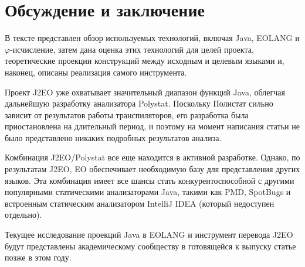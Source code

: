 \documentclass[oneside,final,14pt,a4paper]{extreport}
\theoremstyle{definition}
\theoremstyle{remark}
\theoremstyle{remark}
\begin{document}
\section{Обсуждение и заключение}

В тексте представлен обзор используемых технологий, включая Java, EOLANG и $\varphi$-исчисление, затем дана оценка этих технологий для целей проекта, теоретические проекции конструкций между исходным и целевым языками и, наконец, описаны реализация самого инструмента.

Проект J2EO уже охватывает значительный диапазон функций Java, облегчая дальнейшую разработку анализатора Polystat. Поскольку Полистат сильно зависит от результатов работы транспиляторов, его разработка была приостановлена ​​на длительный период, и поэтому на момент написания статьи не было представлено никаких подробных результатов анализа.

Комбинация J2EO/Polystat все еще находится в активной разработке. Однако, по результатам J2EO, EO обеспечивает необходимую базу для представления других языков. Эта комбинация имеет все шансы стать конкурентоспособной с другими популярными статическими анализаторами Java, такими как PMD, SpotBugs и встроенным статическим анализатором IntelliJ IDEA (который недоступен отдельно).

Текущее исследование проекций Java в EOLANG и инструмент перевода J2EO будут представлены академическому сообществу в готовящейся к выпуску статье позже в этом году.


\printbibliography[heading=bibintoc,title={Использованная библиография}]
\end{document}
